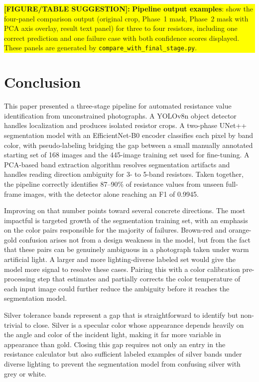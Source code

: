 \documentclass[conference]{IEEEtran}
\newcommand{\figbox}[1]{%
  \vspace{4pt}%
  \noindent
  \colorbox{yellow}{%
    \parbox{\dimexpr\columnwidth-2\fboxsep\relax}{%
      \small\textbf{[FIGURE/TABLE SUGGESTION]:} #1%
    }%
  }%
  \vspace{4pt}%
}
\begin{document}
\figbox{%
  \textbf{Pipeline output examples}: show the four-panel
  comparison output (original crop, Phase~1 mask, Phase~2
  mask with PCA axis overlay, result text panel) for three
  to four resistors, including one correct prediction and
  one failure case with both confidence scores displayed.
  These panels are generated by
  \texttt{compare\_with\_final\_stage.py}.
}
 
\section{Conclusion}
\label{sec:conclusion}
 
This paper presented a three-stage pipeline for automated
resistance value identification from unconstrained
photographs.
A YOLOv8n object detector handles localization and produces
isolated resistor crops.
A two-phase UNet++ segmentation model with an EfficientNet-B0
encoder classifies each pixel by band color, with
pseudo-labeling bridging the gap between a small manually
annotated starting set of 168 images and the 445-image
training set used for fine-tuning.
A PCA-based band extraction algorithm resolves segmentation
artifacts and handles reading direction ambiguity for
3- to 5-band resistors.
Taken together, the pipeline correctly identifies 87--90\%
of resistance values from unseen full-frame images, with the
detector alone reaching an F1 of 0.9945.
 
Improving on that number points toward several concrete
directions.
The most impactful is targeted growth of the segmentation
training set, with an emphasis on the color pairs responsible
for the majority of failures.
Brown-red and orange-gold confusion arises not from a design
weakness in the model, but from the fact that these pairs can
be genuinely ambiguous in a photograph taken under warm
artificial light.
A larger and more lighting-diverse labeled set would give the
model more signal to resolve these cases.
Pairing this with a color calibration pre-processing step
that estimates and partially corrects the color temperature
of each input image could further reduce the ambiguity before
it reaches the segmentation model.
 
Silver tolerance bands represent a gap that is straightforward
to identify but non-trivial to close.
Silver is a specular color whose appearance depends heavily on
the angle and color of the incident light, making it far more
variable in appearance than gold.
Closing this gap requires not only an entry in the resistance
calculator but also sufficient labeled examples of silver
bands under diverse lighting to prevent the segmentation model
from confusing silver with grey or white.
 
\end{document}

